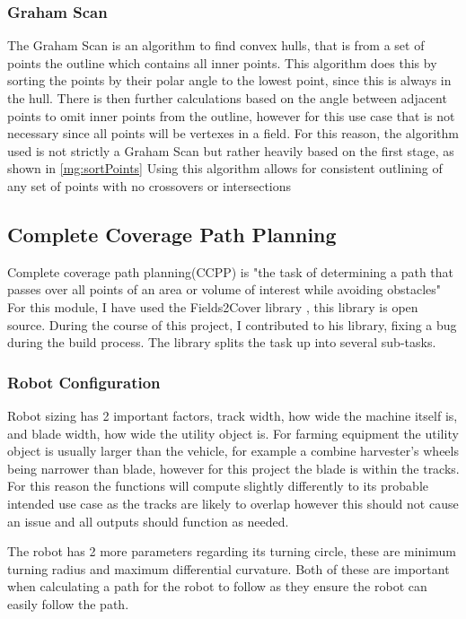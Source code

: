 \documentclass[final]{cmpreport_02}
\begin{document}
\subsubsection{Graham Scan}
The Graham Scan \citep{graham1972efficient} is an algorithm to find convex hulls, that is from a set of points the outline which contains all inner points.
This algorithm does this by sorting the points by their polar angle to the lowest point, since this is always in the hull.
There is then further calculations based on the angle between adjacent points to omit inner points from the outline, however for this use case that is not necessary since all points will be vertexes in a field.
For this reason, the algorithm used is not strictly a Graham Scan but rather heavily based on the first stage, as shown in \ref{mg:sortPoints}
Using this algorithm allows for consistent outlining of any set of points with no crossovers or intersections

\subsection{Complete Coverage Path Planning}
Complete coverage path planning(CCPP) is "the task of determining a path that passes over all points of an area or volume of interest while avoiding obstacles" \citep{zhao2023complete}
For this module, I have used the Fields2Cover library \citep{fields2cover}, this library is open source.
During the course of this project, I contributed to his library, fixing a bug during the build process.
The library splits the task up into several sub-tasks.


\subsubsection{Robot Configuration}
Robot sizing has 2 important factors, track width, how wide the machine itself is, and blade width, how wide the utility object is.
For farming equipment the utility object is usually larger than the vehicle, for example a combine harvester's wheels being narrower than blade, however for this project the blade is within the tracks.
For this reason the functions will compute slightly differently to its probable intended use case as the tracks are likely to overlap however this should not cause an issue and all outputs should function as needed.

The robot has 2 more parameters regarding its turning circle, these are minimum turning radius and maximum differential curvature.
Both of these are important when calculating a path for the robot to follow as they ensure the robot can easily follow the path.
\end{document}

